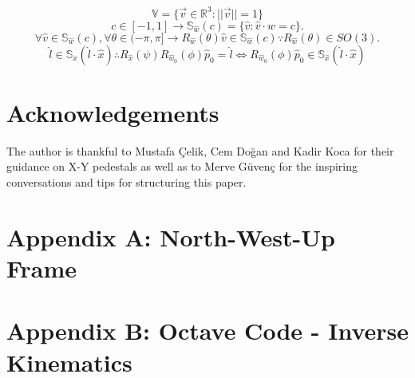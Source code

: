 \documentclass[a4paper,onecolumn,11pt]{article}
\begin{document}
\begin{equation}
    \mathbb{V} = \{ \vec v \in \mathbb{R}^3 : || \vec v || = 1 \}
\end{equation}
\begin{equation}
    c \in [-1,1] \rightarrow \mathbb{S}_{\hat w}(c) = \{ \hat v :
        \hat v \cdot \hat w = c \}.
\end{equation}
\begin{equation}
    \forall \hat v \in \mathbb{S}_{\hat w}(c), \forall \theta \in (-\pi,\pi]
        \rightarrow R_{\hat w}(\theta)\hat v \in \mathbb{S}_{\hat w}(c)
        \because R_{\hat w}(\theta) \in SO(3).
\end{equation}
\begin{equation}
    \hat l \in \mathbb{S}_{\hat x} (\hat l \cdot \hat x) \therefore 
    R_{\hat x} (\psi) R_{\hat w_0}(\phi) \hat p_0 = \hat l
    \Leftrightarrow R_{\hat w_0}(\phi) \hat p_0 
    \in \mathbb{S}_{\hat x}(\hat l \cdot \hat x)
\end{equation}


\section*{Acknowledgements}
The author is thankful to Mustafa Çelik, Cem Doğan and Kadir Koca for their 
guidance on X-Y pedestals as well as to Merve Güvenç for the inspiring 
conversations and tips for structuring this paper.


\printbibliography

\section*{Appendix A: North-West-Up Frame}
\section*{Appendix B: Octave Code - Inverse Kinematics}

\end{document}
